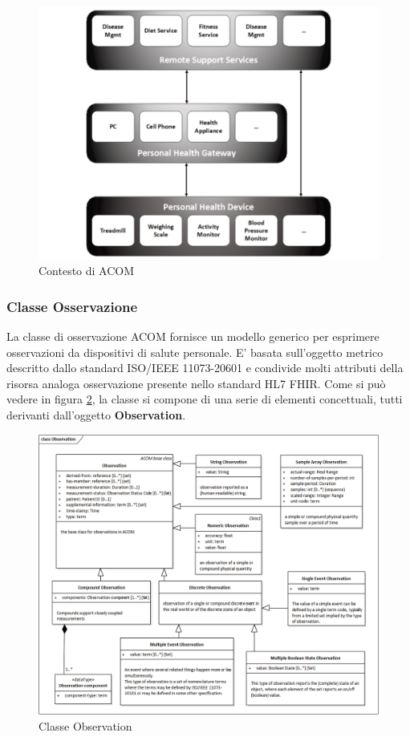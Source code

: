 \documentclass[a4paper]{article}
\begin{document}
\begin{figure}[H]
    \centering
    \includegraphics[width=1\textwidth]{figures/overall context of work.png}
    \caption{Contesto di ACOM}
    \label{fig:overallContextOfWork}
\end{figure}

\subsubsection{Classe Osservazione}
La classe di osservazione ACOM fornisce un modello generico per esprimere osservazioni da dispositivi di salute personale.
E' basata sull'oggetto metrico descritto dallo standard ISO/IEEE 11073-20601 e condivide molti attributi della risorsa analoga osservazione presente nello standard HL7 FHIR.
Come si può vedere in figura \ref{fig:observationClass}, la classe si compone di una serie di elementi concettuali, tutti derivanti dall'oggetto \textbf{Observation}.

\begin{figure}[H]
    \centering
    \includegraphics[width=1\textwidth]{figures/observation class.png}
    \caption{Classe Observation}
    \label{fig:observationClass}
\end{figure}
\end{document}
